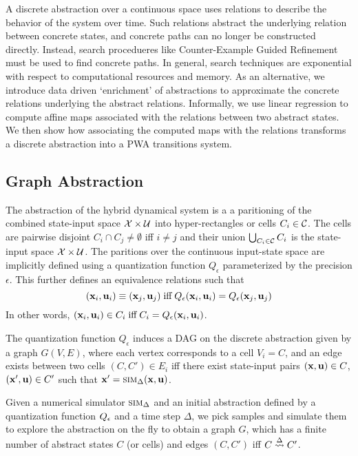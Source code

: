 
A discrete abstraction over a continuous space uses relations to
describe the behavior of the system over time. Such relations abstract
the underlying relation between concrete states, and concrete paths
can no longer be constructed directly. Instead, search procedueres
like Counter-Example Guided Refinement must be used to find concrete
paths. In general, search techniques are exponential with respect to
computational resources and memory. As an alternative, we introduce
data driven `enrichment' of abstractions to approximate the concrete
relations underlying the abstract relations. Informally, we use linear
regression to compute affine maps associated with the relations
between two abstract states. We then show how associating the computed
maps with the relations transforms a discrete abstraction into a PWA
transitions system.

\subsection{Graph Abstraction}

The abstraction of the hybrid dynamical system is a a
paritioning of the combined state-input space $\mathcal{X} \times
\mathcal{U}$ into hyper-rectangles or cells $C_i \in \mathcal{C}$. The cells are
pairwise disjoint $C_i \cap C_j \neq \emptyset$ iff $i \neq j$ and
their union $\bigcup_{C_i\in\mathcal{C}}C_i$ is the state-input
space $\mathcal{X} \times \mathcal{U}$. The paritions over
the continuous input-state space are implicitly defined using a quantization
function $Q_\epsilon$ parameterized by the precision $\epsilon$.
This further defines an equivalence relations such that
\[
    (\mathbf{x}_i, \mathbf{u}_i) \equiv (\mathbf{x}_j, \mathbf{u}_j) \;\text{iff}\; Q_\epsilon(\mathbf{x}_i,
    \mathbf{u}_i) = Q_\epsilon(\mathbf{x}_j, \mathbf{u}_j)
\]
In other words, $(\mathbf{x}_i, \mathbf{u}_i) \in C_i \; \text{iff} \; C_i =
Q_\epsilon(\mathbf{x}_i, \mathbf{u}_i)$.

\begin{definition}
    The quantization function $Q_\epsilon$ induces a DAG on the discrete
    abstraction given by a graph $G(V, E)$, where each vertex
    corresponds to a cell $V_i = C$, and an edge exists between two
    cells $(C, C') \in E_i$ iff there exist state-input pairs
    $(\mathbf{x},\mathbf{u}) \in C$, $(\mathbf{x}', \mathbf{u}) \in C'$ such that $\mathbf{x}' =
    \mbox{\sc sim}_\Delta(\mathbf{x}, \mathbf{u} )$.
\end{definition}


Given a numerical simulator $\mbox{\sc sim}_\Delta$ and an initial abstraction
defined by a quantization function $Q_\epsilon$ and a time step
$\Delta$, we pick samples and simulate them to explore the abstraction
on the fly to obtain a graph $G$, which has a finite number of
abstract states $C$ (or cells) and edges $(C,C')$ iff $C
\overset{\Delta}{\rightsquigarrow} C'$.


